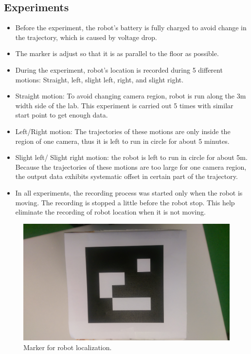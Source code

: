 \documentclass[paper=a4, fontsize=11pt]{scrartcl} %
\begin{document}
    \subsection{Experiments}
    \begin{itemize}
   		\item Before the experiment, the robot's battery is fully charged to avoid change in the trajectory, which is caused by voltage drop.
   		\item The marker is adjust so that it is as parallel to the floor as possible.
	    \item During the experiment, robot's location is recorded during 5 different motions: Straight, left, slight left, right, and slight right.
	    \item Straight motion: To avoid changing camera region, robot is run along the 3m width side of the lab. This experiment is carried out 5 times with similar start point to get enough data.
	    \item Left/Right motion: The trajectories of these motions are only inside the region of one camera, thus it is left to run in circle for about 5 minutes.
	    \item Slight left/ Slight right motion: the robot is left to run in circle for about 5m. Because the trajectories of these motions are too large for one camera region, the output data exhibits systematic offset in certain part of the trajectory.
	    \item In all experiments, the recording process was started only when the robot is moving. The recording is stopped a little before the robot stop. This help eliminate the recording of robot location when it is not moving.  
    \end{itemize}
    \begin{figure}[H]
        \begin{center}
            \setlength{\fboxsep}{0.5pt} %
            \setlength{\fboxrule}{0.5pt}
            \includegraphics[width=12cm,fbox]{images/marker.jpg}
            \caption{Marker for robot localization.}
        \end{center}
    \end{figure}
    
\end{document}
